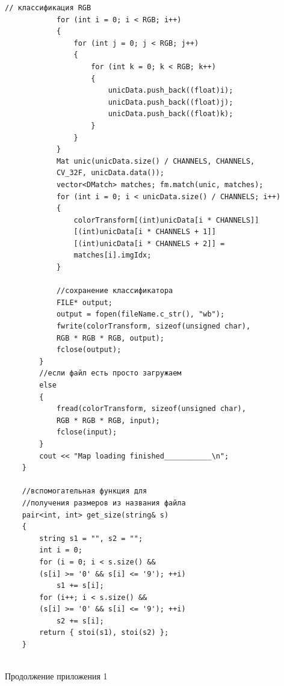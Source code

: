 \documentclass[14pt, a4paper]{extreport}
\begin{document}
\begin{Verbatim}[fontseries=c, fontsize=\fontsize{10pt}{12pt}\selectfont]
			// классификация RGB
			for (int i = 0; i < RGB; i++)
			{
				for (int j = 0; j < RGB; j++)
				{
					for (int k = 0; k < RGB; k++)
					{
						unicData.push_back((float)i);
						unicData.push_back((float)j);
						unicData.push_back((float)k);
					}
				}
			}
			Mat unic(unicData.size() / CHANNELS, CHANNELS, 
			CV_32F, unicData.data());
			vector<DMatch> matches; fm.match(unic, matches);
			for (int i = 0; i < unicData.size() / CHANNELS; i++)
			{
				colorTransform[(int)unicData[i * CHANNELS]]
				[(int)unicData[i * CHANNELS + 1]]
				[(int)unicData[i * CHANNELS + 2]] = 
				matches[i].imgIdx;
			}
			
			//сохранение классификатора
			FILE* output;
			output = fopen(fileName.c_str(), "wb");
			fwrite(colorTransform, sizeof(unsigned char), 
			RGB * RGB * RGB, output);
			fclose(output);
		}
		//если файл есть просто загружаем
		else
		{
			fread(colorTransform, sizeof(unsigned char), 
			RGB * RGB * RGB, input);
			fclose(input);
		}
		cout << "Map loading finished___________\n";
	}
	
	//вспомогательная функция для 
	//получения размеров из названия файла
	pair<int, int> get_size(string& s)
	{
		string s1 = "", s2 = "";
		int i = 0;
		for (i = 0; i < s.size() &&
		(s[i] >= '0' && s[i] <= '9'); ++i)
			s1 += s[i];
		for (i++; i < s.size() &&
		(s[i] >= '0' && s[i] <= '9'); ++i)
			s2 += s[i];
		return { stoi(s1), stoi(s2) };
	}
	
\end{Verbatim}
\begin{flushright} \noindent Продолжение приложения 1 \end{flushright}
\end{document}
